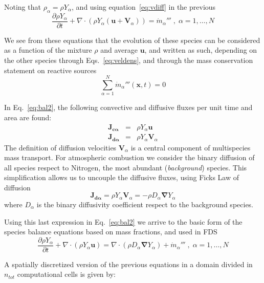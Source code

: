 Noting that $ \rho_\alpha = \rho Y_\alpha$, and using equation~\eqref{eq:vdiff} in the previous
%
\begin{equation}
   \frac{\partial \rho Y_\alpha}{ \partial t} + \nabla \cdot \left( \rho Y_\alpha  (\mathbf{u}+\mathbf{V}_\alpha) \right) = \dot{m}_\alpha''' \; , \; \alpha=1,\dots,N \label{eq:bal2}
\end{equation}
%

We see from these equations that the evolution of these species can be considered as a function of the mixture $\rho$ and average $\mathbf{u}$, and written as such, depending on the other species through Eqs.~\eqref{eq:veldens}, and through the mass conservation statement on reactive sources
%
\begin{equation}
  \sum\limits_{\alpha=1}^{N} \dot{m}_\alpha'''(\mathbf{x},t) = 0
\end{equation}
%

In Eq.~\eqref{eq:bal2}, the following convective and diffusive fluxes per unit time and area are found:
%
\begin{eqnarray}
  \mathbf{J_{c \alpha}} &=& \rho Y_\alpha  \mathbf{u} \label{eq:jc} \\
  \mathbf{J_{d \alpha}} &=& \rho Y_\alpha  \mathbf{V}_\alpha \label{eq:jd}
\end{eqnarray}
%
The definition of diffusion velocities $\mathbf{V}_\alpha$ is a central component of multispecies mass transport. For atmospheric combustion we consider the binary diffusion of all species respect to Nitrogen, the most abundant (\textit{background}) species. This simplification allows us to uncouple the diffusive fluxes, using Ficks Law of diffusion
%
\begin{equation}
   \mathbf{J_{d \alpha}} = \rho Y_\alpha  \mathbf{V}_\alpha = - \rho D_\alpha \boldsymbol{\nabla} Y_\alpha
\end{equation}
%
where $D_\alpha$ is the binary diffusivity coefficient respect to the background species.

Using this last expression in Eq.~\eqref{eq:bal2} we arrive to the basic form of the species balance equations based on mass fractions, and used in FDS
%
\begin{equation}
   \frac{\partial \rho Y_\alpha}{ \partial t} + \nabla \cdot ( \rho Y_\alpha  \mathbf{u} ) = \nabla \cdot ( \rho D_\alpha \boldsymbol{\nabla} Y_\alpha ) + \dot{m}_\alpha''' \; , \; \alpha=1,\dots,N \label{eq:bal3}
\end{equation}
%

A spatially discretized version of the previous equations in a domain divided in $n_{tot}$ computational cells is given by:

